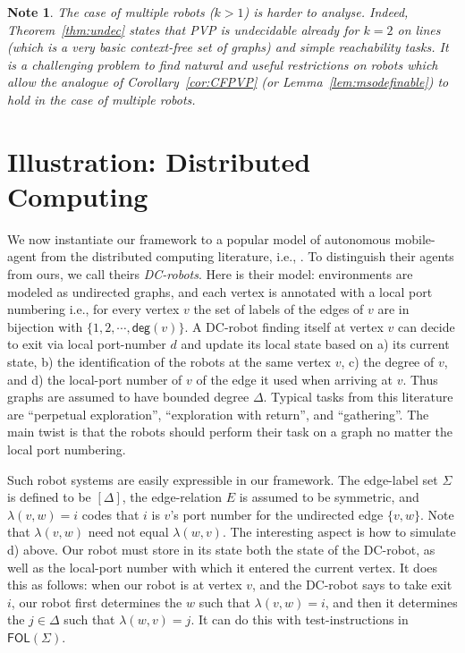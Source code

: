 \documentclass{aamas2015}
\newtheorem{note}{Note}
\def\deg{\textsf{deg}}
\def\fol{\mathsf{FOL}}
\newcommand{\sr}[1]{\footnote{{\color{red} Note. #1}}}
\begin{document}
\begin{note} \label{note:dec}
The case of multiple robots ($k > 1$) is harder to analyse. Indeed, Theorem~\ref{thm:undec} states that PVP is undecidable already for $k=2$ on lines (which is a very basic context-free set of graphs) and simple reachability tasks. It is a challenging problem to find natural and useful restrictions on robots which allow the analogue of Corollary~\ref{cor:CFPVP} (or Lemma~\ref{lem:msodefinable}) to hold in the case of multiple robots. 
\end{note}

\section{Illustration: Distributed Computing} \label{sec:DC}

We now instantiate our framework to a popular model of autonomous mobile-agent from the distributed computing literature, i.e., \cite{FIPPP04,Diks200438,Cohen05graphexploration,KKR06,GR08,Das13}. To distinguish their agents from ours, we call theirs {\em DC-robots}.
Here is their model: environments are modeled as undirected graphs, and each vertex is annotated with a local port numbering i.e., for every vertex $v$ the set of labels of the edges of $v$
are in bijection with $\{1,2,\cdots,\deg(v)\}$.  A DC-robot finding itself at vertex $v$ can decide to exit via local port-number $d$ and update its local state based on a) its current state, b) the identification of the robots at the same vertex $v$, c) the degree of $v$, and d) the local-port number of $v$ of the edge it used when arriving at $v$. Thus graphs are assumed to have bounded degree $\Delta$.
Typical tasks from this literature are ``perpetual exploration'', ``exploration with return'', and ``gathering''. The main twist is that the robots should perform their task on a graph no matter the local port numbering. 


Such robot systems are easily expressible in our framework. The edge-label set $\Sigma$ is defined to be $[\Delta]$, the edge-relation $E$ is assumed to be symmetric, and $\lambda(v,w) = i$ codes that $i$ is $v$'s port number for the undirected edge $\{v,w\}$. Note that $\lambda(v,w)$ need not equal $\lambda(w,v)$.  The interesting aspect is how to simulate d) above.  Our robot must store in its state both the state of the DC-robot, as well as the local-port number with which it entered the current vertex. It does this as follows: when our robot is at vertex $v$, and the DC-robot says to take exit $i$, our robot first determines the $w$ such that $\lambda(v,w) = i$, and then it determines the $j \in \Delta$ such that $\lambda(w,v) = j$. It can do this with test-instructions in $\fol(\Sigma)$.
\end{document}
